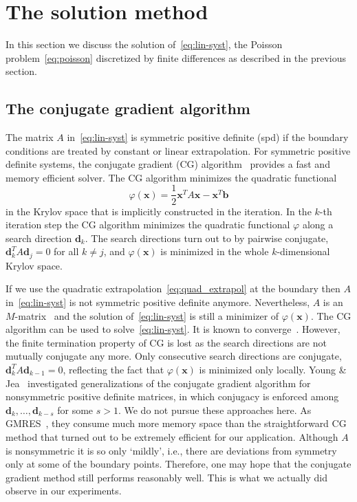 \section{The solution method}
\label{sec:method}

In this section we discuss the solution of~\eqref{eq:lin-syst}, the
Poisson problem~\eqref{eq:poisson} discretized by finite differences as
described in the previous section.

\subsection{The conjugate gradient algorithm}

The matrix $A$ in~\eqref{eq:lin-syst} is symmetric positive definite
(spd) if the boundary conditions are treated by constant or linear
extrapolation.  For symmetric positive definite systems, the conjugate
gradient (CG) algorithm~\cite{hack:94,hest:52} provides a fast and
memory efficient solver.  The CG algorithm minimizes the quadratic
functional
\begin{equation} \label{eq:cg-funct}
  \varphi(\mathbf{x}) = \frac{1}{2}\mathbf{x}^T A \mathbf{x} - \mathbf{x}^T
  \mathbf{b}
\end{equation}
in the Krylov space that is implicitly constructed in the iteration.  In
the $k$-th iteration step the CG algorithm minimizes the quadratic
functional $\varphi$ along a search direction $\mathbf{d}_k$.  The search
directions turn out to by pairwise conjugate, $\mathbf{d}_k^T A
\mathbf{d}_j = 0$ for all $k\neq j$, and $\varphi(\mathbf{x})$ is
minimized in the whole $k$-dimensional Krylov space.

If we use the quadratic extrapolation~\eqref{eq:quad_extrapol} at the
boundary then $A$ in~\eqref{eq:lin-syst} is not symmetric positive
definite anymore.  Nevertheless, $A$ is an $M$-matrix~\cite{hack:94} and
the solution of~\eqref{eq:lin-syst} is still a minimizer of
$\varphi(\mathbf{x})$.  The CG algorithm can be used to
solve~\eqref{eq:lin-syst}.  It is known to converge~\cite{gree:97}.
However, the finite termination property of CG is lost as the search
directions are not mutually conjugate any more.  Only consecutive search
directions are conjugate, $\mathbf{d}_k^T A \mathbf{d}_{k-1} = 0$,
reflecting the fact that $\varphi(\mathbf{x})$ is minimized only
locally.
Young \& Jea~\cite{yoje:80} investigated generalizations of the
conjugate gradient algorithm for nonsymmetric positive definite
matrices, in which conjugacy is enforced among $\mathbf{d}_k, \ldots,
\mathbf{d}_{k-s}$ for some $s>1$.  We do not pursue these approaches
here.  As GMRES~\cite{sasc:86}, they consume much more memory space than
the straightforward CG method that turned out to be extremely efficient
for our application.  Although $A$ is nonsymmetric it is so only
`mildly', i.e., there are deviations from symmetry only at some of
the boundary points.  Therefore, one may hope that the conjugate
gradient method still performs reasonably well.  This is what we
actually did observe in our experiments.

